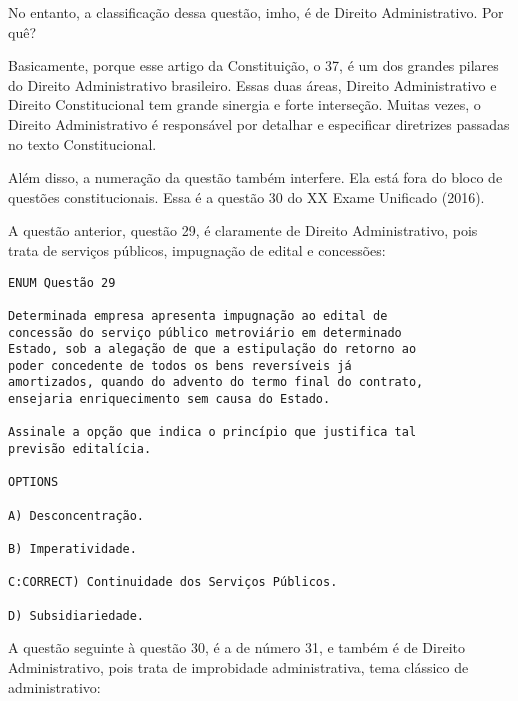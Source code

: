 \documentclass{article}
\begin{document}
No entanto, a classificação dessa questão, imho, é de Direito Administrativo. Por quê?

Basicamente, porque esse artigo da Constituição, o 37, é um dos grandes pilares do Direito Administrativo brasileiro. Essas duas áreas, Direito Administrativo e Direito Constitucional tem grande sinergia e forte interseção. Muitas vezes, o Direito Administrativo é responsável por detalhar e especificar diretrizes passadas no texto Constitucional.

Além disso, a numeração da questão também interfere. Ela está fora do bloco de questões constitucionais. Essa é a questão 30 do XX Exame Unificado (2016).

A questão anterior, questão 29, é claramente de Direito Administrativo, pois trata de serviços públicos, impugnação de edital e concessões:

\begin{verbatim}
ENUM Questão 29 
 
Determinada empresa apresenta impugnação ao edital de 
concessão do serviço público metroviário em determinado 
Estado, sob a alegação de que a estipulação do retorno ao 
poder concedente de todos os bens reversíveis já 
amortizados, quando do advento do termo final do contrato, 
ensejaria enriquecimento sem causa do Estado. 
 
Assinale a opção que indica o princípio que justifica tal 
previsão editalícia. 
 
OPTIONS

A) Desconcentração. 

B) Imperatividade. 

C:CORRECT) Continuidade dos Serviços Públicos. 

D) Subsidiariedade. 
\end{verbatim} 

A questão seguinte à questão 30, é a de número 31, e também é de Direito Administrativo, pois trata de improbidade administrativa, tema clássico de administrativo:
\end{document}

